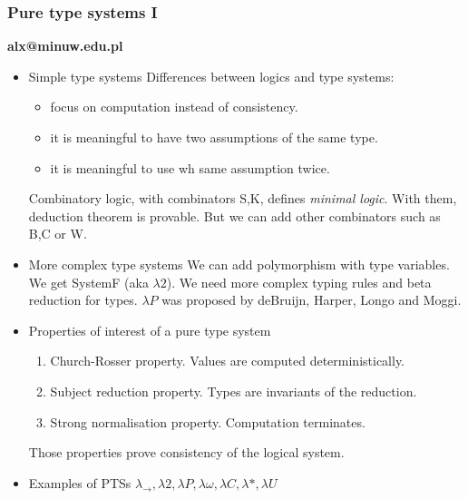 \documentclass[11pt]{article}
\begin{document}
\subsubsection*{Pure type systems I}
\label{sec-9-1-4}
\textbf{alx@minuw.edu.pl}

\begin{itemize}
\item Simple type systems
\label{sec-9-1-4-1}
Differences between logics and type systems:

\begin{itemize}
\item focus on computation instead of consistency.
\item it is meaningful to have two assumptions of the same type.
\item it is meaningful to use wh same assumption twice.
\end{itemize}

Combinatory logic, with combinators S,K, defines \emph{minimal logic}.
With them, deduction theorem is provable. But we can add other
combinators such as B,C or W.
\item More complex type systems
\label{sec-9-1-4-2}
We can add polymorphism with type variables. We get SystemF (aka
$\lambda 2$). We need more complex typing rules and beta reduction for types.
$\lambda P$ was proposed by deBruijn, Harper, Longo and Moggi.

\item Properties of interest of a pure type system
\label{sec-9-1-4-3}

\begin{enumerate}
\item Church-Rosser property. Values are computed deterministically.
\item Subject reduction property. Types are invariants of the reduction.
\item Strong normalisation property. Computation terminates.
\end{enumerate}

Those properties prove consistency of the logical system.
\item Examples of PTSs
\label{sec-9-1-4-4}
$\lambda_{\to}, \lambda 2, \lambda P, \lambda \omega, \lambda C, \lambda \ast, \lambda U$


\end{itemize}
\end{document}
